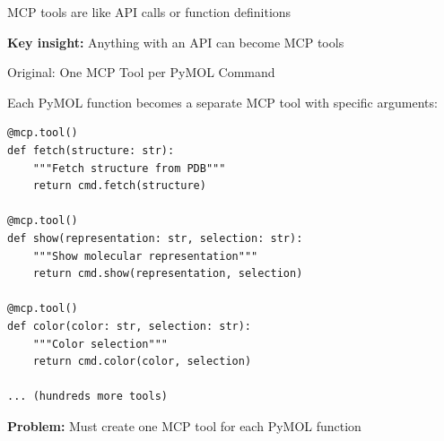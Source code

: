 \documentclass[aspectratio=169]{beamer}
\begin{document}
\begin{frame}

\vspace{1cm}
\centering
\Large

MCP tools are like API calls or function definitions

\vspace{1cm}


\vspace{1cm}

\large
\textbf{Key insight:} Anything with an API can become MCP tools

\end{frame}



\begin{frame}[fragile]{Original: One MCP Tool per PyMOL Command}

\vspace{0.1cm}
\small
Each PyMOL function becomes a separate MCP tool with specific arguments:

\vspace{0.2cm}

\begin{verbatim}
@mcp.tool()
def fetch(structure: str):
    """Fetch structure from PDB"""
    return cmd.fetch(structure)

@mcp.tool()
def show(representation: str, selection: str):
    """Show molecular representation"""
    return cmd.show(representation, selection)

@mcp.tool()
def color(color: str, selection: str):
    """Color selection"""
    return cmd.color(color, selection)

... (hundreds more tools)
\end{verbatim}

\vspace{0.1cm}
\normalsize
\textbf{Problem:} Must create one MCP tool for each PyMOL function

\end{frame}
\end{document}
